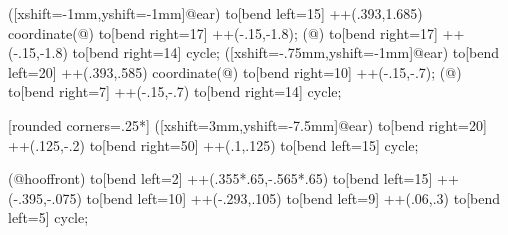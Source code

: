 {%
\if@pingu@@horse@@donkey@
{} ([xshift=-1mm,yshift=-1mm]@ear) to[bend left=15] ++(.393,1.685) coordinate(@) to[bend right=17] ++(-.15,-1.8);
 (@) to[bend right=17] ++(-.15,-1.8) to[bend right=14] cycle;
\else
{} ([xshift=-.75mm,yshift=-1mm]@ear) to[bend left=20] ++(.393,.585) coordinate(@) to[bend right=10] ++(-.15,-.7);
 (@) to[bend right=7] ++(-.15,-.7) to[bend right=14] cycle;
\fi

 [rounded corners=.25*\pingu@@horse@scale] ([xshift=3mm,yshift=-7.5mm]@ear) to[bend right=20] ++(.125,-.2) to[bend right=50] ++(.1,.125) to[bend left=15] cycle;

 (@hooffront) to[bend left=2] ++(.355*.65,-.565*.65) to[bend left=15] ++(-.395,-.075) to[bend left=10] ++(-.293,.105) to[bend left=9] ++(.06,.3) to[bend left=5] cycle;
}

\newif\if@pingu@@horse@@donkey@


